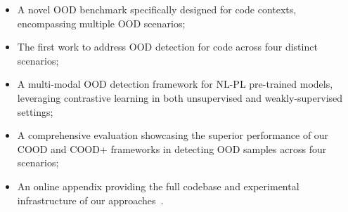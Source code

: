 \begin{itemize}[noitemsep, leftmargin=1.2em]  
\item A novel OOD benchmark specifically designed for code contexts, encompassing multiple OOD scenarios;

\item The first work to address OOD detection for code across four distinct scenarios;  

\item A multi-modal OOD detection framework for NL-PL pre-trained models, leveraging contrastive learning in both unsupervised and weakly-supervised settings;

\item A comprehensive evaluation showcasing the superior performance of our COOD and COOD+ frameworks in detecting OOD samples across four scenarios;

\item An online appendix providing the full codebase and experimental infrastructure of our approaches~\cite{cood-tool}. 

\end{itemize}
